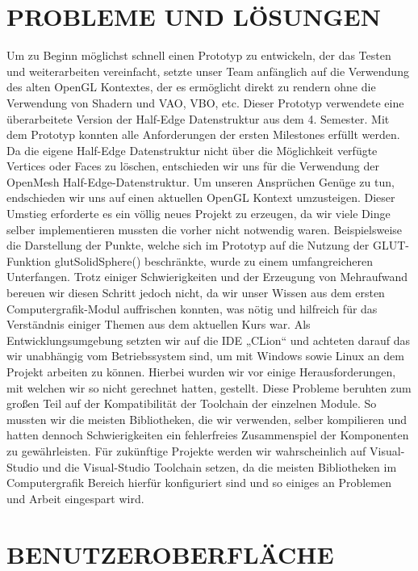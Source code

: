 	\section{\Large PROBLEME UND LÖSUNGEN}
Um zu Beginn möglichst schnell einen Prototyp zu entwickeln, der das Testen und weiterarbeiten vereinfacht, setzte unser Team anfänglich auf die Verwendung des alten OpenGL Kontextes, der es ermöglicht direkt zu rendern ohne die Verwendung von Shadern und VAO, VBO, etc. Dieser Prototyp verwendete eine überarbeitete Version der Half-Edge Datenstruktur aus dem 4. Semester. Mit dem Prototyp konnten alle Anforderungen der ersten Milestones erfüllt werden. \newline
Da die eigene Half-Edge Datenstruktur nicht über die Möglichkeit verfügte Vertices oder Faces zu löschen, entschieden wir uns für die Verwendung der OpenMesh Half-Edge-Datenstruktur.\newline
Um unseren Ansprüchen Genüge zu tun, endschieden wir uns auf einen aktuellen OpenGL Kontext umzusteigen. Dieser Umstieg erforderte es ein völlig neues Projekt zu erzeugen, da wir viele Dinge selber implementieren mussten die vorher nicht notwendig waren. Beispielsweise die Darstellung der Punkte, welche sich im Prototyp auf die Nutzung der GLUT-Funktion glutSolidSphere() beschränkte, wurde zu einem umfangreicheren Unterfangen. Trotz einiger Schwierigkeiten und der Erzeugung von Mehraufwand bereuen wir diesen Schritt jedoch nicht, da wir unser Wissen aus dem ersten Computergrafik-Modul auffrischen konnten, was nötig und hilfreich für das Verständnis einiger Themen aus dem aktuellen Kurs war.\newline
Als Entwicklungsumgebung setzten wir auf die IDE „CLion“ und achteten darauf das wir unabhängig vom Betriebssystem sind, um mit Windows sowie Linux an dem Projekt arbeiten zu können. Hierbei wurden wir vor einige Herausforderungen, mit welchen wir so nicht gerechnet hatten, gestellt. Diese Probleme beruhten zum großen Teil auf der Kompatibilität der Toolchain der einzelnen Module. So mussten wir die meisten Bibliotheken, die wir verwenden, selber kompilieren und hatten dennoch Schwierigkeiten ein fehlerfreies Zusammenspiel der Komponenten zu gewährleisten. Für zukünftige Projekte werden wir wahrscheinlich auf Visual-Studio und die Visual-Studio Toolchain setzen, da die meisten Bibliotheken im Computergrafik Bereich hierfür konfiguriert sind und so einiges an Problemen und Arbeit eingespart wird.




	
	\section{\Large BENUTZEROBERFLÄCHE}
	
	

	

		